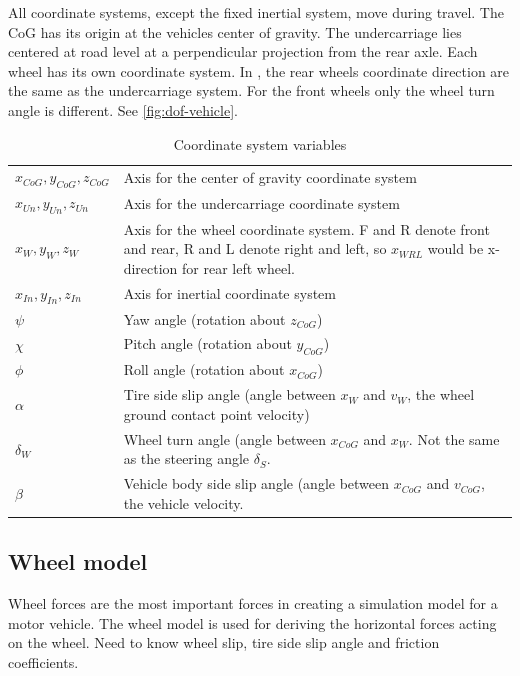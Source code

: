 All coordinate systems, except the fixed inertial system, move during travel. The CoG has its origin at the vehicles center of gravity. The undercarriage lies centered at road level at a perpendicular projection from the rear axle. 
Each wheel has its own coordinate system. In \cite{kiencke}, the rear wheels coordinate direction are the same as the undercarriage system. For the front wheels only the wheel turn angle is different. See \cref{fig:dof-vehicle}.

\begin{table}
    \centering
    \begin{tabularx}{\linewidth}{|l|L|}
    \hline
     $x_{CoG}, y_{CoG}, z_{CoG}$ & Axis for the center of gravity coordinate system \\
     $x_{Un}, y_{Un}, z_{Un}$ & Axis for the undercarriage coordinate system \\
     $x_{W}, y_{W}, z_{W}$ & Axis for the wheel coordinate system. F and R denote front and rear, R and L denote right and left, so $x_{WRL}$ would be x-direction for rear left wheel. \\
     $x_{In}, y_{In}, z_{In}$ &  Axis for inertial coordinate system \\
     $\psi$ & Yaw angle (rotation about $z_{CoG}$) \\
     $\chi$ & Pitch angle (rotation about $y_{CoG}$) \\
     $\phi$ & Roll angle (rotation about $x_{CoG}$) \\
     $\alpha$ & Tire side slip angle (angle between $x_W$ and $v_W$, the wheel ground contact point velocity) \\
     $\delta_W$ & Wheel turn angle (angle between $x_{CoG}$ and $x_W$. Not the same as the steering angle $\delta_S$. \\
     $\beta$ & Vehicle body side slip angle (angle between $x_{CoG}$ and $v_{CoG}$, the vehicle velocity. \\ \hline
    \end{tabularx}
    \label{tab_coordinate_variables}
    \caption{Coordinate system variables}
\end{table}


\subsection{Wheel model}

Wheel forces are the most important forces in creating a simulation model for a motor vehicle. The wheel model is used for deriving the horizontal forces acting on the wheel. Need to know wheel slip, tire side slip angle and friction coefficients.


